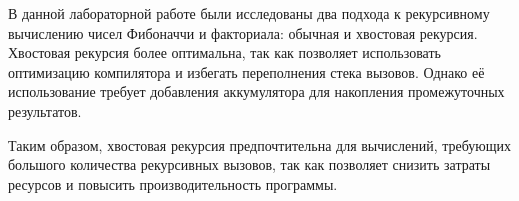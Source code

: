 

В данной лабораторной работе были исследованы два подхода к рекурсивному вычислению чисел Фибоначчи и факториала: обычная и хвостовая рекурсия. Хвостовая рекурсия более оптимальна, так как позволяет использовать оптимизацию компилятора и избегать переполнения стека вызовов. Однако её использование требует добавления аккумулятора для накопления промежуточных результатов.

Таким образом, хвостовая рекурсия предпочтительна для вычислений, требующих большого количества рекурсивных вызовов, так как позволяет снизить затраты ресурсов и повысить производительность программы.
